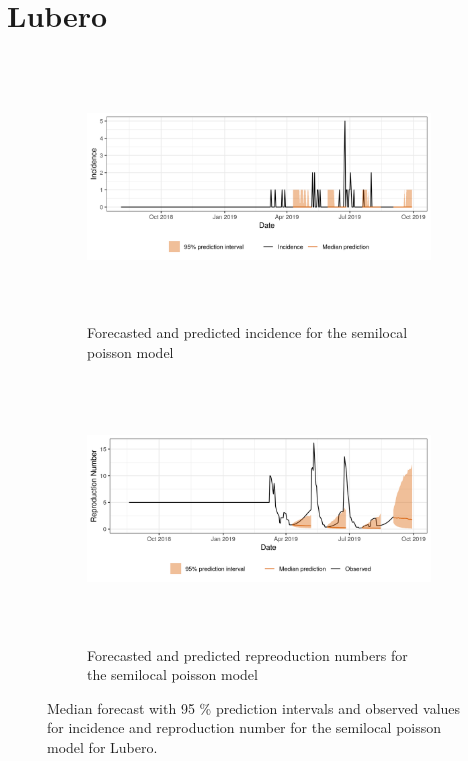 \section{ Lubero }\begin{figure}[H]\begin{subfigure}{\textwidth}  \centering  \includegraphics[width=0.9\linewidth, height=7cm]{../output/Lubero_predictions.png}  \caption{Forecasted and predicted incidence for the semilocal poisson model}\end{subfigure}

\begin{subfigure}{\textwidth}  \centering  \includegraphics[width=0.9\linewidth, height=7cm]{../output/Lubero_Rs.png}  \caption{Forecasted and predicted repreoduction numbers for the semilocal poisson model}\end{subfigure}  \caption{Median forecast with 95 \% prediction intervals and observed values for incidence and reproduction number for the semilocal poisson model for Lubero.}\end{figure}

